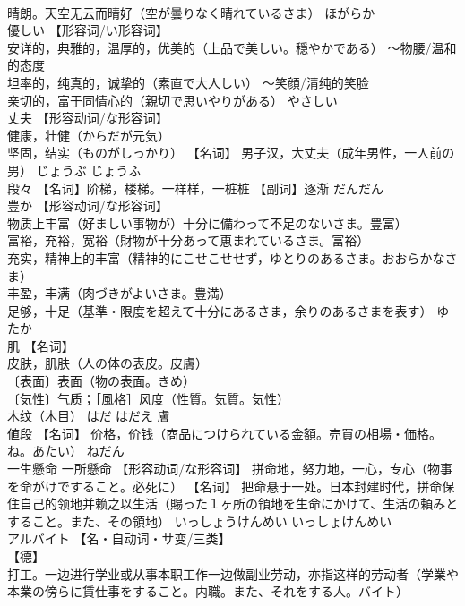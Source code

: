 \documentclass[8pt]{extreport}
\begin{document}
\begin{CJK}{UTF8}{min}
\\	晴朗。天空无云而晴好（空が曇りなく晴れているさま）	ほがらか	
\\	優しい	【形容词/い形容词】 
\\	安详的，典雅的，温厚的，优美的（上品で美しい。穏やかである） ～物腰/温和的态度 
\\	坦率的，纯真的，诚挚的（素直で大人しい） ～笑顔/清纯的笑脸 
\\	亲切的，富于同情心的（親切で思いやりがある）	やさしい	
\\	丈夫	【形容动词/な形容词】 
\\	健康，壮健（からだが元気） 
\\	坚固，结实（ものがしっかり） 【名词】 男子汉，大丈夫（成年男性，一人前の男）	じょうぶ じょうふ	
\\	段々	【名词】阶梯，楼梯。一样样，一桩桩 【副词】逐渐	だんだん	
\\	豊か	【形容动词/な形容词】 
\\	物质上丰富（好ましい事物が）十分に備わって不足のないさま。豊富） 
\\	富裕，充裕，宽裕（財物が十分あって恵まれているさま。富裕） 
\\	充实，精神上的丰富（精神的にこせこせせず，ゆとりのあるさま。おおらかなさま） 
\\	丰盈，丰满（肉づきがよいさま。豊満） 
\\	足够，十足（基準・限度を超えて十分にあるさま，余りのあるさまを表す）	ゆたか	
\\	肌	【名词】 
\\	皮肤，肌肤（人の体の表皮。皮膚） 
\\	〔表面〕表面（物の表面。きめ） 
\\	〔気性〕气质；［風格］风度（性質。気質。気性） 
\\	木纹（木目）	はだ はだえ	膚
\\	値段	【名词】 价格，价钱（商品につけられている金額。売買の相場・価格。ね。あたい）	ねだん	
\\	一生懸命 一所懸命	【形容动词/な形容词】 拼命地，努力地，一心，专心（物事を命がけですること。必死に） 【名词】 把命悬于一处。日本封建时代，拼命保住自己的领地并赖之以生活（賜った１ヶ所の領地を生命にかけて、生活の頼みとすること。また、その領地）	いっしょうけんめい いっしょけんめい	
\\	アルバイト	【名・自动词・サ变/三类】 
\\	【德】
\\	打工。一边进行学业或从事本职工作一边做副业劳动，亦指这样的劳动者（学業や本業の傍らに賃仕事をすること。内職。また、それをする人。バイト） 

\end{CJK}
\end{document}
